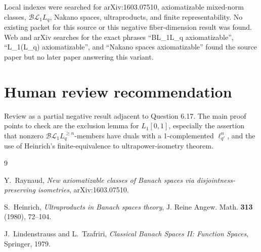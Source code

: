 \documentclass[11pt]{article}
\newcommand{\BL}{\mathcal{BL}}
\begin{document}
Local indexes were searched for arXiv:1603.07510, axiomatizable mixed-norm
classes, \(\BL_1L_q\), Nakano spaces, ultraproducts, and finite
representability. No existing packet for this source or this negative
fiber-dimension result was found. Web and arXiv searches for the exact phrases
``BL\_1L\_q axiomatizable'', ``L\_1(L\_q) axiomatizable'', and
``Nakano spaces axiomatizable'' found the source paper but no later paper
answering this variant.

\section*{Human review recommendation}

Review as a partial negative result adjacent to Question 6.17. The main proof
points to check are the exclusion lemma for \(L_1[0,1]\), especially the
assertion that nonzero \(\BL_1L_q^{\ge n}\)-members have duals with a
1-complemented \(\ell_{q'}^n\), and the use of Heinrich's finite-equivalence
to ultrapower-isometry theorem.

\begin{thebibliography}{9}

Y.~Raynaud,
\emph{New axiomatizable classes of Banach spaces via
disjointness-preserving isometries},
arXiv:1603.07510.

S.~Heinrich,
\emph{Ultraproducts in Banach spaces theory},
J. Reine Angew. Math. \textbf{313} (1980), 72--104.

J.~Lindenstrauss and L.~Tzafriri,
\emph{Classical Banach Spaces II: Function Spaces},
Springer, 1979.

\end{thebibliography}
\end{document}

